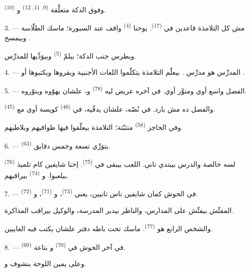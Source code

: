 وفوق الدكة متعلَّقة  \textsuperscript{(9, 11, 12)}
و \textsuperscript{(10)}.

3. --- مش كل التلامذة قاعدين في  \textsuperscript{(17)}. يوحنا
\textsuperscript{(4)} واقف عند السبورة؛ ماسك الطلّاسة وبيمسح .

وبطرس جنب الدكة؛ بيلمّ  \textsuperscript{(5)} وبيوَدِّيها
للمدرِّس.

4. --- المدرِّس  هو مدرِّس . بيعلّم التلامذة
يتكلّموا اللغات الأجنبية ويقروها ويكتبوها  أو .

5. --- الفصل واسع أوي ومنوَّر أوي. في آخره  عريض ليه
 \textsuperscript{(78)} و، علشان يهوّوه
وينوّروه.

والفصل ده مش بارد. في نُصّه، علشان يدفّيه، في 
\textsuperscript{(46)} كويسة أوي مع  \textsuperscript{(45)}.

وفي الحاجز  \textsuperscript{(58)} متثبّتة؛ التلامذة بيعلّقوا
فيها طواقيهم وبلاطيهم.

\VUsaut{5.2mm}
\VUsaut{3.6mm}

6. ---  \textsuperscript{(63)} بتوَرِّي تسعة وخمس دقايق.

 \textsuperscript{(76)} لسه خالصة والدرس بيبتدي تاني. اللعب
بيبقى في  \textsuperscript{(75)}. إحنا شايفين كام تلميذ بيلعبوا.
و \textsuperscript{(74)} بيراقبهم.

7. --- في الحوش كمان شايفين ناس تانيين، يعني 
\textsuperscript{(73)}، و \textsuperscript{(71)}،
و \textsuperscript{(72)}.

المفتِّش بيفتِّش على المدارس، والناظر بيدير المدرسة، والوكيل بيراقب المذاكرة.

والشخص الرابع هو  \textsuperscript{(77)}. ماسك تحت باطه دفتر
علشان يكتب فيه الغايبين.

8. --- في آخر الحوش في  \textsuperscript{(70)}
و بتاعة  \textsuperscript{(69)}.

وعلى يمين اللوحة بنشوف   و.

